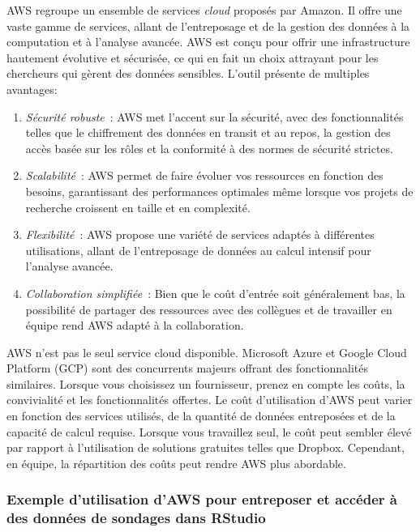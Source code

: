 \documentclass[
  letterpaper,
  DIV=11,
  numbers=noendperiod]{scrreprt}
\begin{document}
AWS regroupe un ensemble de services \emph{cloud} proposés par Amazon.
Il offre une vaste gamme de services, allant de l'entreposage et de la
gestion des données à la computation et à l'analyse avancée. AWS est
conçu pour offrir une infrastructure hautement évolutive et sécurisée,
ce qui en fait un choix attrayant pour les chercheurs qui gèrent des
données sensibles. L'outil présente de multiples avantages:

\begin{enumerate}
\def\labelenumi{\arabic{enumi}.}
\item
  \emph{Sécurité robuste}~: AWS met l'accent sur la sécurité, avec des
  fonctionnalités telles que le chiffrement des données en transit et au
  repos, la gestion des accès basée sur les rôles et la conformité à des
  normes de sécurité strictes.
\item
  \emph{Scalabilité}~: AWS permet de faire évoluer vos ressources en
  fonction des besoins, garantissant des performances optimales même
  lorsque vos projets de recherche croissent en taille et en complexité.
\item
  \emph{Flexibilité}~: AWS propose une variété de services adaptés à
  différentes utilisations, allant de l'entreposage de données au calcul
  intensif pour l'analyse avancée.
\item
  \emph{Collaboration simplifiée}~: Bien que le coût d'entrée soit
  généralement bas, la possibilité de partager des ressources avec des
  collègues et de travailler en équipe rend AWS adapté à la
  collaboration.
\end{enumerate}

AWS n'est pas le seul service cloud disponible. Microsoft Azure et
Google Cloud Platform (GCP) sont des concurrents majeurs offrant des
fonctionnalités similaires. Lorsque vous choisissez un fournisseur,
prenez en compte les coûts, la convivialité et les fonctionnalités
offertes. Le coût d'utilisation d'AWS peut varier en fonction des
services utilisés, de la quantité de données entreposées et de la
capacité de calcul requise. Lorsque vous travaillez seul, le coût peut
sembler élevé par rapport à l'utilisation de solutions gratuites telles
que Dropbox. Cependant, en équipe, la répartition des coûts peut rendre
AWS plus abordable.

\subsubsection{Exemple d'utilisation d'AWS pour entreposer et accéder à
des données de sondages dans
RStudio}\label{exemple-dutilisation-daws-pour-entreposer-et-accuxe9der-uxe0-des-donnuxe9es-de-sondages-dans-rstudio}
\end{document}
